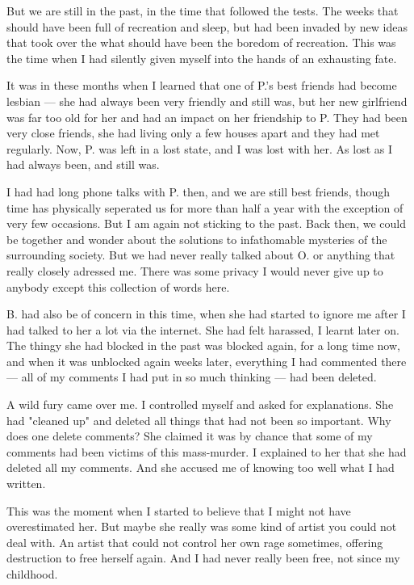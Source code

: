 But we are still in the past, in the time that followed the tests. The weeks that should have been full of recreation and sleep, but had been invaded by new ideas that took over the what should have been the boredom of recreation. This was the time when I had silently given myself into the hands of an exhausting fate.

It was in these months when I learned that one of P.'s best friends had become lesbian --- she had always been very friendly and still was, but her new girlfriend was far too old for her and had an impact on her friendship to P. They had been very close friends, she had living only a few houses apart and they had met regularly. Now, P. was left in a lost state, and I was lost with her. As lost as I had always been, and still was.

I had had long phone talks with P. then, and we are still best friends, though time has physically seperated us for more than half a year with the exception of very few occasions. 
But I am again not sticking to the past. Back then, we could be together and wonder about the solutions to infathomable mysteries of the surrounding society. But we had never really talked about O. or anything that really closely adressed me. There was some privacy I would never give up to anybody except this collection of words here.

B. had also be of concern in this time, when she had started to ignore me after I had talked to her a lot via the internet. She had felt harassed, I learnt later on. The thingy she had blocked in the past was blocked again, for a long time now, and when it was unblocked again weeks later, everything I had commented there --- all of my comments I had put in so much thinking --- had been deleted.

A wild fury came over me. I controlled myself and asked for explanations. She had "cleaned up" and deleted all things that had not been so important. Why does one delete comments? She claimed it was by chance that some of my comments had been victims of this mass-murder. I explained to her that she had deleted all my comments. And she accused me of knowing too well what I had written.

This was the moment when I started to believe that I might not have overestimated her. But maybe she really was some kind of artist you could not deal with. An artist that could not control her own rage sometimes, offering destruction to free herself again.
And I had never really been free, not since my childhood.

